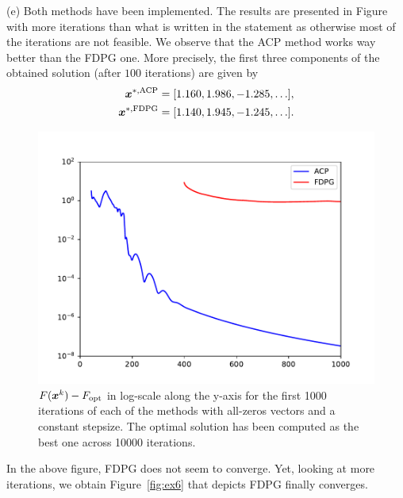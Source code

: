\indent (e) Both methods have been implemented.  
The results are presented in Figure~ with more 
iterations than what is written in the statement as otherwise 
most of the iterations are not feasible. We observe that the ACP 
method works way better than the FDPG one. 
More precisely, the first three components of the obtained 
solution (after $100$ iterations) are given by
\begin{align*}
  \boldsymbol x^{*,\text{ACP}} &= [ 1.160,  1.986, -1.285,\hdots],\\
  \boldsymbol x^{*,\text{FDPG}} &= [1.140,  1.945, -1.245,\hdots].
\end{align*}
%
\begin{figure}[H]
  \centering
  \includegraphics[width=14cm]{images/part3_ex2_fig2.pdf}
  \caption{$F(\boldsymbol x^k)-F_{\text{opt}}$ in log-scale along the 
  y-axis for the first 1000 iterations of each of the methods 
  with all-zeros vectors and a constant stepsize. The optimal solution has been computed as the best one across 10000 iterations. }
  \label{fig:ex5}
\end{figure}
%
In the above figure, FDPG does not seem to converge. 
Yet, looking at more iterations, we obtain Figure~\ref{fig:ex6}
that depicts FDPG finally converges.
%
